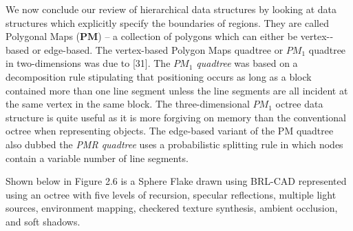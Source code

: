 \hspace{30} We   now   conclude   our   review   of   hierarchical   data   structures   by   looking   at  
data   structures   which   explicitly   specify   the   boundaries   of   regions.   They   are  
called   Polygonal   Maps   ($\mathbf{PM}$) – a   collection   of   polygons   which   can   either   be  
vertex-­based   or   edge-­based.   The   vertex-­based   Polygon   Maps   quadtree   or   $PM_1$
 quadtree   in   two­-dimensions   was   due   to   [31].   The   \textit{$PM_1$   quadtree}   was   based   on   a  
decomposition   rule   stipulating   that   positioning   occurs   as   long   as   a   block  
contained   more   than   one   line   segment   unless   the   line   segments   are   all   incident  
at   the   same   vertex   in   the   same   block.   The   three-­dimensional   $PM_1$   octree   data  
structure   is   quite   useful   as   it   is   more   forgiving   on   memory   than   the   conventional  
octree   when   representing   objects.   The   edge­-based   variant   of   the   PM   quadtree also dubbed the \textit{PMR quadtree}   uses   a   probabilistic   splitting   rule   in   which   nodes   contain   a  
variable number of line segments.

\hspace{30} Shown   below   in Figure 2.6 is   a   Sphere   Flake   drawn   using   BRL-­CAD   represented  
using   an   octree   with   five   levels   of   recursion,   specular   reflections,   multiple   light  
sources,   environment   mapping,   checkered   texture   synthesis,   ambient  
occlusion, and soft shadows.

